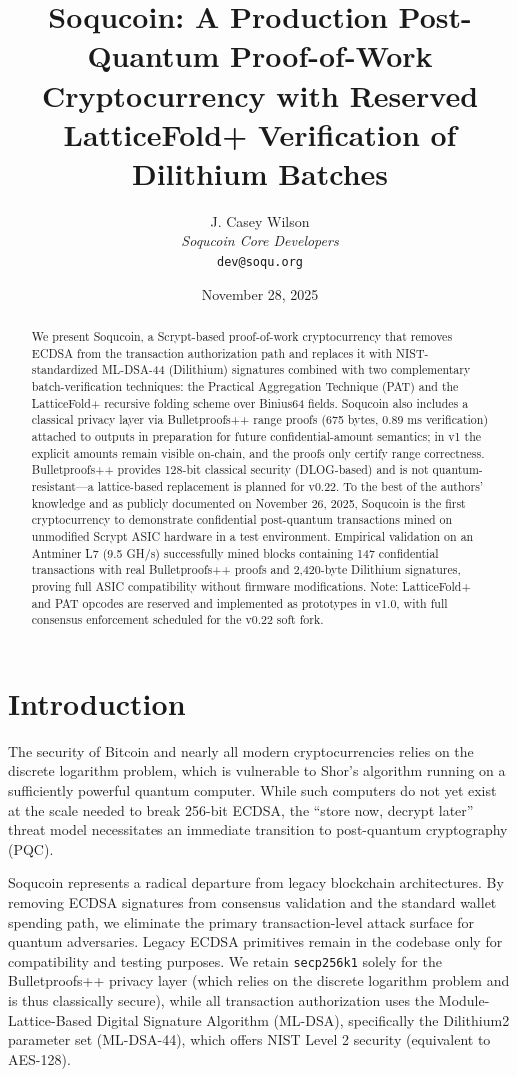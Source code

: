 \documentclass[10pt]{article}
\title{\textbf{Soqucoin: A Production Post-Quantum Proof-of-Work Cryptocurrency with Reserved LatticeFold+ Verification of Dilithium Batches}}
\author{J. Casey Wilson \\ \textit{Soqucoin Core Developers} \\ \texttt{dev@soqu.org}}
\date{November 28, 2025}
\begin{document}
\maketitle

\begin{abstract}
We present Soqucoin, a Scrypt-based proof-of-work cryptocurrency that removes ECDSA from the transaction authorization path and replaces it with NIST-standardized ML-DSA-44 (Dilithium) signatures combined with two complementary batch-verification techniques: the Practical Aggregation Technique (PAT) and the LatticeFold+ recursive folding scheme over Binius64 fields. Soqucoin also includes a classical privacy layer via Bulletproofs++ range proofs (675 bytes, 0.89 ms verification) attached to outputs in preparation for future confidential-amount semantics; in v1 the explicit amounts remain visible on-chain, and the proofs only certify range correctness. Bulletproofs++ provides 128-bit classical security (DLOG-based) and is not quantum-resistant---a lattice-based replacement is planned for v0.22. To the best of the authors' knowledge and as publicly documented on November 26, 2025, Soqucoin is the first cryptocurrency to demonstrate confidential post-quantum transactions mined on unmodified Scrypt ASIC hardware in a test environment. Empirical validation on an Antminer L7 (9.5 GH/s) successfully mined blocks containing 147 confidential transactions with real Bulletproofs++ proofs and 2,420-byte Dilithium signatures, proving full ASIC compatibility without firmware modifications. Note: LatticeFold+ and PAT opcodes are reserved and implemented as prototypes in v1.0, with full consensus enforcement scheduled for the v0.22 soft fork.
\end{abstract}

\section{Introduction}
The security of Bitcoin and nearly all modern cryptocurrencies relies on the discrete logarithm problem, which is vulnerable to Shor's algorithm running on a sufficiently powerful quantum computer. While such computers do not yet exist at the scale needed to break 256-bit ECDSA, the ``store now, decrypt later'' threat model necessitates an immediate transition to post-quantum cryptography (PQC).

Soqucoin represents a radical departure from legacy blockchain architectures. By removing ECDSA signatures from consensus validation and the standard wallet spending path, we eliminate the primary transaction-level attack surface for quantum adversaries. Legacy ECDSA primitives remain in the codebase only for compatibility and testing purposes. We retain \texttt{secp256k1} solely for the Bulletproofs++ privacy layer (which relies on the discrete logarithm problem and is thus classically secure), while all transaction authorization uses the Module-Lattice-Based Digital Signature Algorithm (ML-DSA), specifically the Dilithium2 parameter set (ML-DSA-44), which offers NIST Level 2 security (equivalent to AES-128).
\end{document}
